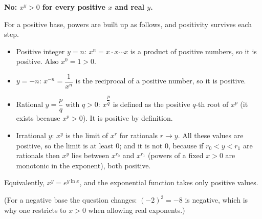 \textbf{No: $x^y>0$ for every positive $x$ and real $y$.}

For a positive base, powers are built up as follows, and positivity survives each step.
\begin{itemize}
\item Positive integer $y=n$: $x^n=x\cdot x\cdots x$ is a product of positive numbers, so it is positive. Also $x^0=1>0$.
\item $y=-n$: $x^{-n}=\dfrac{1}{x^n}$ is the reciprocal of a positive number, so it is positive.
\item Rational $y=\dfrac {p}{q}$ with $q>0$: $x^{\dfrac {p}{q}}$ is defined as the positive $q$-th root of $x^p$ (it exists because $x^p>0$). It is positive by definition.
\item Irrational $y$: $x^y$ is the limit of $x^{r}$ for rationals $r\to y$. All these values are positive, so the limit is at least $0$; and it is not $0$, because if $r_0<y<r_1$ are rationals then $x^y$ lies between $x^{r_0}$ and $x^{r_1}$ (powers of a fixed $x>0$ are monotonic in the exponent), both positive.
\end{itemize}
Equivalently, $x^y=e^{y\ln x}$, and the exponential function takes only positive values.

(For a negative base the question changes: $(-2)^3=-8$ is negative, which is why one restricts to $x>0$ when allowing real exponents.)
